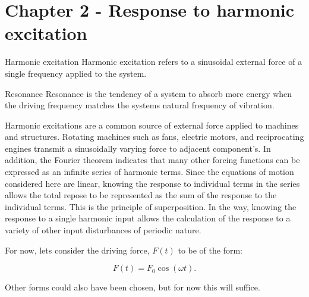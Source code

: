 \chapter{Chapter 2 - Response to harmonic excitation}
  \begin{fmd-definition}{Harmonic excitation}
    Harmonic excitation refers to a sinusoidal external force of a single frequency applied to the system.
  \end{fmd-definition}

  \begin{fmd-definition}{Resonance}
    Resonance is the tendency of a system to absorb more energy when the driving frequency matches the systems natural frequency of vibration.
  \end{fmd-definition}

  Harmonic excitations are a common source of external force applied to machines and structures. Rotating machines such as fans, electric motors, and reciprocating engines transmit a sinusoidally varying force to adjacent component's. In addition, the Fourier theorem indicates that many other forcing functions can be expressed as an infinite series of harmonic terms. Since the equations of motion considered here are linear, knowing the response to individual terms in the series allows the total repose to be represented as the sum of the response to the individual terms. This is the principle of superposition. In the way, knowing the response to a single harmonic input allows the calculation of the response to a variety of other input disturbances of periodic nature.

  For now, lets consider the driving force, $F(t)$ to be of the form:

  \begin{equation}
    F(t) = F_0 \cos(\omega t).
  \end{equation}

  \noindent Other forms could also have been chosen, but for now this will suffice.

  \begin{figure}
    \begin{tikzpicture}
    \end{tikzpicture}
  \end{figure}
  
